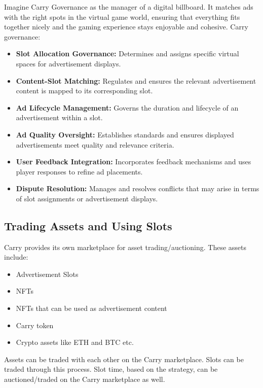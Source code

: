 Imagine Carry Governance as the manager of a digital billboard. It matches ads with the right spots in the virtual game world, ensuring that everything fits together nicely and the gaming experience stays enjoyable and cohesive. Carry governance:

\begin{itemize}
    \item \textbf{Slot Allocation Governance:} Determines and assigns specific virtual spaces for advertisement displays.
    
    \item \textbf{Content-Slot Matching:} Regulates and ensures the relevant advertisement content is mapped to its corresponding slot.

    \item \textbf{Ad Lifecycle Management:} Governs the duration and lifecycle of an advertisement within a slot.

    \item \textbf{Ad Quality Oversight:} Establishes standards and ensures displayed advertisements meet quality and relevance criteria.
    
    \item \textbf{User Feedback Integration:} Incorporates feedback mechanisms and uses player responses to refine ad placements.

    \item \textbf{Dispute Resolution:} Manages and resolves conflicts that may arise in terms of slot assignments or advertisement displays.
\end{itemize}

\subsection{Trading Assets and Using Slots}
Carry provides its own marketplace for asset trading/auctioning. These assets include:
\begin{itemize}
    \item Advertisement Slots
    \item NFTs
    \item NFTs that can be used as advertisement content
    \item Carry token
    \item Crypto assets like ETH and BTC etc.
\end{itemize}

Assets can be traded with each other on the Carry marketplace. Slots can be traded through this process. Slot time, based on the strategy, can be auctioned/traded on the Carry marketplace as well. 

